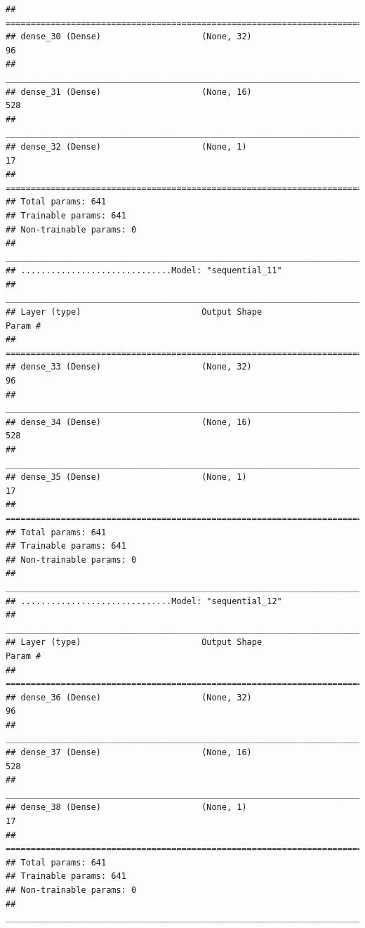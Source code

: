 \documentclass[
]{article}
\begin{document}
\begin{verbatim}
## ================================================================================
## dense_30 (Dense)                    (None, 32)                      96          
## ________________________________________________________________________________
## dense_31 (Dense)                    (None, 16)                      528         
## ________________________________________________________________________________
## dense_32 (Dense)                    (None, 1)                       17          
## ================================================================================
## Total params: 641
## Trainable params: 641
## Non-trainable params: 0
## ________________________________________________________________________________
## ..............................Model: "sequential_11"
## ________________________________________________________________________________
## Layer (type)                        Output Shape                    Param #     
## ================================================================================
## dense_33 (Dense)                    (None, 32)                      96          
## ________________________________________________________________________________
## dense_34 (Dense)                    (None, 16)                      528         
## ________________________________________________________________________________
## dense_35 (Dense)                    (None, 1)                       17          
## ================================================================================
## Total params: 641
## Trainable params: 641
## Non-trainable params: 0
## ________________________________________________________________________________
## ..............................Model: "sequential_12"
## ________________________________________________________________________________
## Layer (type)                        Output Shape                    Param #     
## ================================================================================
## dense_36 (Dense)                    (None, 32)                      96          
## ________________________________________________________________________________
## dense_37 (Dense)                    (None, 16)                      528         
## ________________________________________________________________________________
## dense_38 (Dense)                    (None, 1)                       17          
## ================================================================================
## Total params: 641
## Trainable params: 641
## Non-trainable params: 0
## ________________________________________________________________________________

\end{verbatim}
\end{document}
